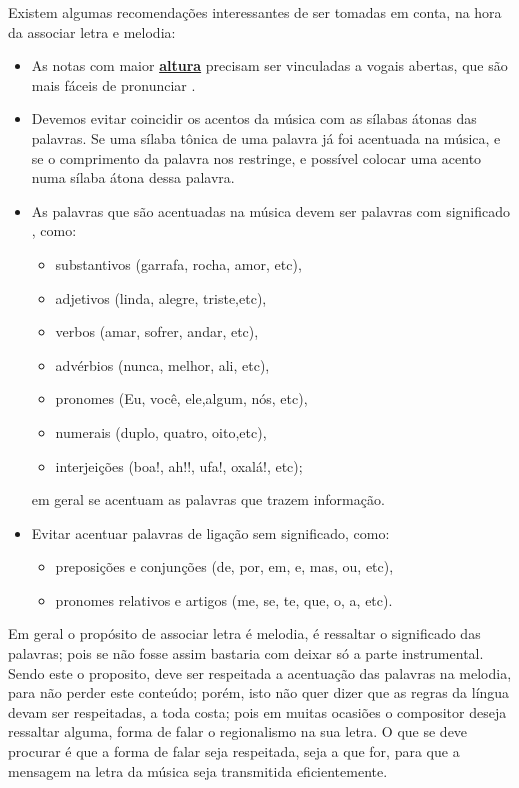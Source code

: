 Existem algumas recomendações interessantes de ser tomadas em conta, na hora da associar letra e melodia:
\begin{itemize}
\item As notas com maior \hyperref[sec:pos:Altura]{\textbf{altura}} precisam ser vinculadas a vogais abertas,
 que são mais fáceis de pronunciar \cite[pp. 61]{howard1991aprendendo}.
\item Devemos evitar coincidir os acentos da música com as sílabas átonas das palavras.
Se uma sílaba tônica de uma palavra já foi acentuada na música, 
e se o comprimento da palavra nos restringe,
e possível colocar uma acento numa sílaba átona dessa palavra. 
\item As palavras que são acentuadas na música devem ser palavras com significado \cite[pp. 61]{howard1991aprendendo},
como:
\begin{itemize}
\item substantivos (garrafa, rocha, amor, etc), 
\item adjetivos (linda, alegre, triste,etc), 
\item verbos (amar, sofrer, andar, etc), 
\item advérbios (nunca, melhor, ali, etc), 
\item pronomes (Eu, você, ele,algum,  nós, etc), 
\item numerais (duplo, quatro, oito,etc), 
\item interjeições (boa!, ah!!, ufa!, oxalá!, etc); 
\end{itemize}
em geral se acentuam as palavras que trazem informação.
\item Evitar acentuar palavras de ligação sem significado, como: 
\begin{itemize}
\item preposições e conjunções (de, por, em, e, mas, ou, etc),
\item pronomes relativos e artigos (me, se, te, que, o, a, etc).
\end{itemize}
\end{itemize}



Em geral o propósito de associar letra é melodia, 
é ressaltar o significado das palavras;
pois se não fosse assim bastaria com deixar só a parte instrumental.
Sendo este o proposito, deve ser respeitada a acentuação das palavras na melodia,
para não perder este conteúdo;
porém, isto não quer dizer que as regras da língua devam ser respeitadas,
a toda costa; pois em muitas ocasiões o compositor deseja ressaltar alguma,
forma de falar o regionalismo na sua letra. 
O que se deve procurar é que a forma de falar seja respeitada,
seja a que for, para que a mensagem na letra da música seja transmitida eficientemente.



